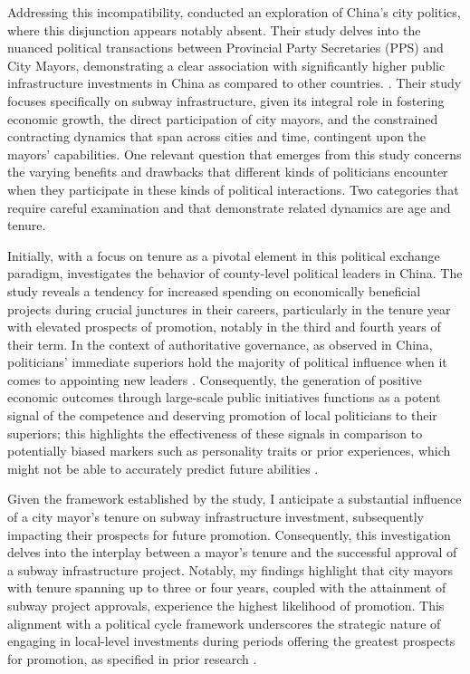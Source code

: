\documentclass[12pt, ]{article}
\begin{document}
Addressing this incompatibility, \citet{lei2022private} conducted an
exploration of China's city politics, where this disjunction appears
notably absent. Their study delves into the nuanced political
transactions between Provincial Party Secretaries (PPS) and City Mayors,
demonstrating a clear association with significantly higher public
infrastructure investments in China as compared to other countries.
\citep{lei2022private}. Their study focuses specifically on subway
infrastructure, given its integral role in fostering economic growth,
the direct participation of city mayors, and the constrained contracting
dynamics that span across cities and time, contingent upon the mayors'
capabilities. One relevant question that emerges from this study
concerns the varying benefits and drawbacks that different kinds of
politicians encounter when they participate in these kinds of political
interactions. Two categories that require careful examination and that
demonstrate related dynamics are age and tenure.

Initially, with a focus on tenure as a pivotal element in this political
exchange paradigm, \citet{guo2009china} investigates the behavior of
county-level political leaders in China. The study reveals a tendency
for increased spending on economically beneficial projects during
crucial junctures in their careers, particularly in the tenure year with
elevated prospects of promotion, notably in the third and fourth years
of their term. In the context of authoritative governance, as observed
in China, politicians' immediate superiors hold the majority of
political influence when it comes to appointing new leaders
\citep{lei2022private, guo2009china}. Consequently, the generation of
positive economic outcomes through large-scale public initiatives
functions as a potent signal of the competence and deserving promotion
of local politicians to their superiors; this highlights the
effectiveness of these signals in comparison to potentially biased
markers such as personality traits or prior experiences, which might not
be able to accurately predict future abilities \citep{guo2009china}.

Given the framework established by the \citet{lei2022private} study, I
anticipate a substantial influence of a city mayor's tenure on subway
infrastructure investment, subsequently impacting their prospects for
future promotion. Consequently, this investigation delves into the
interplay between a mayor's tenure and the successful approval of a
subway infrastructure project. Notably, my findings highlight that city
mayors with tenure spanning up to three or four years, coupled with the
attainment of subway project approvals, experience the highest
likelihood of promotion. This alignment with a political cycle framework
underscores the strategic nature of engaging in local-level investments
during periods offering the greatest prospects for promotion, as
specified in prior research \citep{guo2009china}.
\end{document}
